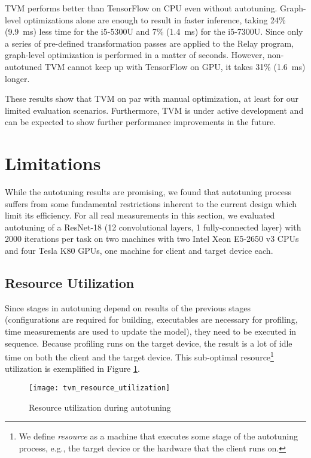TVM performs better than TensorFlow on CPU even without autotuning. Graph-level optimizations alone are enough to result in faster inference, taking 24\% (\SI{9.9}{\milli\second}) less time for the i5-5300U and 7\% (\SI{1.4}{\milli\second}) for the i5-7300U. Since only a series of pre-defined transformation passes are applied to the Relay program, graph-level optimization is performed in a matter of seconds. However, non-autotuned TVM cannot keep up with TensorFlow on GPU, it takes 31\% (\SI{1.6}{\milli\second}) longer.

These results show that TVM on par with manual optimization, at least for our limited evaluation scenarios. Furthermore, TVM is under active development and can be expected to show further performance improvements in the future.

\section{Limitations}
While the autotuning results are promising, we found that autotuning process suffers from some fundamental restrictions inherent to the current design which limit its efficiency. For all real measurements in this section, we evaluated autotuning of a ResNet-18 (12 convolutional layers, 1 fully-connected layer) with 2000 iterations per task on two machines with two Intel Xeon E5-2650 v3 CPUs and four Tesla K80 GPUs, one machine for client and target device each.

\subsection{Resource Utilization}
Since stages in autotuning depend on results of the previous stages (configurations are required for building, executables are necessary for profiling, time measurements are used to update the model), they need to be executed in sequence. Because profiling runs on the target device, the result is a lot of idle time on both the client and the target device. This sub-optimal \gls{resource}\footnote{We define \textit{resource} as a machine that executes some stage of the autotuning process, e.g., the target device or the hardware that the client runs on.} utilization is exemplified in Figure \ref{fig:tvm-res-util}.

\begin{figure}
	\centering
	\texttt{[image: tvm\_resource\_utilization]}%
	\caption{Resource utilization during autotuning}
	\label{fig:tvm-res-util}
\end{figure}

